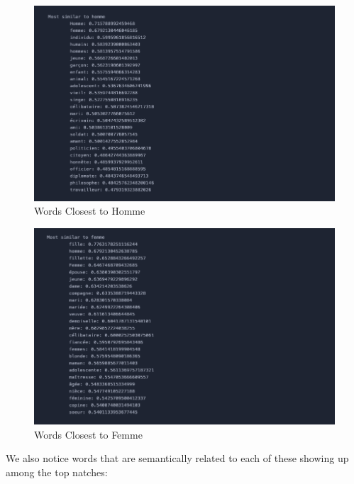 \begin{problem}[1]
  \begin{figure}[H]
    \centering
    \begin{minipage}[b]{\textwidth}
      \centering
      \includegraphics[width=\textwidth]{figures/3-homme-similar.png}
      \caption{Words Closest to Homme}
      \label{fig:word-embeddings-1}
    \end{minipage}
  \end{figure}
  \begin{figure}[H]
    \begin{minipage}[b]{\textwidth}
      \centering
      \includegraphics[width=\textwidth]{figures/3-femme-similar.png}
      \caption{Words Closest to Femme}
      \label{fig:word-embeddings-2}
    \end{minipage}
  \end{figure}

  \begin{answer}
    We also notice words that are semantically related to each of these
    showing up among the top natches:
    

\end{answer}
\end{problem}

